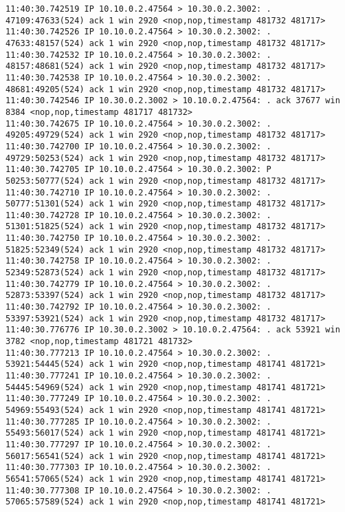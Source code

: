 \documentclass[a4paper,12pt]{article}
\begin{document}
\begin{lstlisting}
11:40:30.742519 IP 10.10.0.2.47564 > 10.30.0.2.3002: . 47109:47633(524) ack 1 win 2920 <nop,nop,timestamp 481732 481717>
11:40:30.742526 IP 10.10.0.2.47564 > 10.30.0.2.3002: . 47633:48157(524) ack 1 win 2920 <nop,nop,timestamp 481732 481717>
11:40:30.742532 IP 10.10.0.2.47564 > 10.30.0.2.3002: . 48157:48681(524) ack 1 win 2920 <nop,nop,timestamp 481732 481717>
11:40:30.742538 IP 10.10.0.2.47564 > 10.30.0.2.3002: . 48681:49205(524) ack 1 win 2920 <nop,nop,timestamp 481732 481717>
11:40:30.742546 IP 10.30.0.2.3002 > 10.10.0.2.47564: . ack 37677 win 8384 <nop,nop,timestamp 481717 481732>
11:40:30.742675 IP 10.10.0.2.47564 > 10.30.0.2.3002: . 49205:49729(524) ack 1 win 2920 <nop,nop,timestamp 481732 481717>
11:40:30.742700 IP 10.10.0.2.47564 > 10.30.0.2.3002: . 49729:50253(524) ack 1 win 2920 <nop,nop,timestamp 481732 481717>
11:40:30.742705 IP 10.10.0.2.47564 > 10.30.0.2.3002: P 50253:50777(524) ack 1 win 2920 <nop,nop,timestamp 481732 481717>
11:40:30.742710 IP 10.10.0.2.47564 > 10.30.0.2.3002: . 50777:51301(524) ack 1 win 2920 <nop,nop,timestamp 481732 481717>
11:40:30.742728 IP 10.10.0.2.47564 > 10.30.0.2.3002: . 51301:51825(524) ack 1 win 2920 <nop,nop,timestamp 481732 481717>
11:40:30.742750 IP 10.10.0.2.47564 > 10.30.0.2.3002: . 51825:52349(524) ack 1 win 2920 <nop,nop,timestamp 481732 481717>
11:40:30.742758 IP 10.10.0.2.47564 > 10.30.0.2.3002: . 52349:52873(524) ack 1 win 2920 <nop,nop,timestamp 481732 481717>
11:40:30.742779 IP 10.10.0.2.47564 > 10.30.0.2.3002: . 52873:53397(524) ack 1 win 2920 <nop,nop,timestamp 481732 481717>
11:40:30.742792 IP 10.10.0.2.47564 > 10.30.0.2.3002: . 53397:53921(524) ack 1 win 2920 <nop,nop,timestamp 481732 481717>
11:40:30.776776 IP 10.30.0.2.3002 > 10.10.0.2.47564: . ack 53921 win 3782 <nop,nop,timestamp 481721 481732>
11:40:30.777213 IP 10.10.0.2.47564 > 10.30.0.2.3002: . 53921:54445(524) ack 1 win 2920 <nop,nop,timestamp 481741 481721>
11:40:30.777241 IP 10.10.0.2.47564 > 10.30.0.2.3002: . 54445:54969(524) ack 1 win 2920 <nop,nop,timestamp 481741 481721>
11:40:30.777249 IP 10.10.0.2.47564 > 10.30.0.2.3002: . 54969:55493(524) ack 1 win 2920 <nop,nop,timestamp 481741 481721>
11:40:30.777285 IP 10.10.0.2.47564 > 10.30.0.2.3002: . 55493:56017(524) ack 1 win 2920 <nop,nop,timestamp 481741 481721>
11:40:30.777297 IP 10.10.0.2.47564 > 10.30.0.2.3002: . 56017:56541(524) ack 1 win 2920 <nop,nop,timestamp 481741 481721>
11:40:30.777303 IP 10.10.0.2.47564 > 10.30.0.2.3002: . 56541:57065(524) ack 1 win 2920 <nop,nop,timestamp 481741 481721>
11:40:30.777308 IP 10.10.0.2.47564 > 10.30.0.2.3002: . 57065:57589(524) ack 1 win 2920 <nop,nop,timestamp 481741 481721>

\end{lstlisting}
\end{document}
